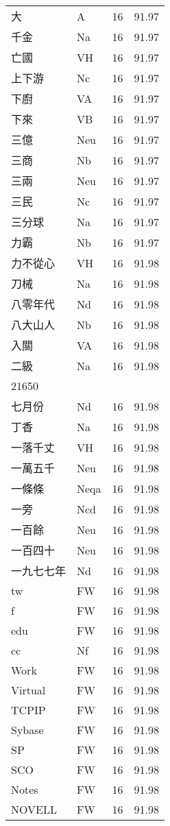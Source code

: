 \documentclass[twocolumn]{book}
\begin{document}
\begin{supertabular}{llrr}
大 & A & 16 &  91.97\\
千金 & Na & 16 &  91.97\\
亡國 & VH & 16 &  91.97\\
上下游 & Nc & 16 &  91.97\\
下廚 & VA & 16 &  91.97\\
下來 & VB & 16 &  91.97\\
三億 & Neu & 16 &  91.97\\
三商 & Nb & 16 &  91.97\\
三兩 & Neu & 16 &  91.97\\
三民 & Nc & 16 &  91.97\\
三分球 & Na & 16 &  91.97\\
力霸 & Nb & 16 &  91.97\\
力不從心 & VH & 16 &  91.98\\
刀械 & Na & 16 &  91.98\\
八零年代 & Nd & 16 &  91.98\\
八大山人 & Nb & 16 &  91.98\\
入關 & VA & 16 &  91.98\\
二級 & Na & 16 &  91.98\\
21650\\
七月份 & Nd & 16 &  91.98\\
丁香 & Na & 16 &  91.98\\
一落千丈 & VH & 16 &  91.98\\
一萬五千 & Neu & 16 &  91.98\\
一條條 & Neqa & 16 &  91.98\\
一旁 & Ncd & 16 &  91.98\\
一百餘 & Neu & 16 &  91.98\\
一百四十 & Neu & 16 &  91.98\\
一九七七年 & Nd & 16 &  91.98\\
tw & FW & 16 &  91.98\\
f & FW & 16 &  91.98\\
edu & FW & 16 &  91.98\\
cc & Nf & 16 &  91.98\\
Work & FW & 16 &  91.98\\
Virtual & FW & 16 &  91.98\\
TCPIP & FW & 16 &  91.98\\
Sybase & FW & 16 &  91.98\\
SP & FW & 16 &  91.98\\
SCO & FW & 16 &  91.98\\
Notes & FW & 16 &  91.98\\
NOVELL & FW & 16 &  91.98\\

\end{supertabular}
\end{document}
